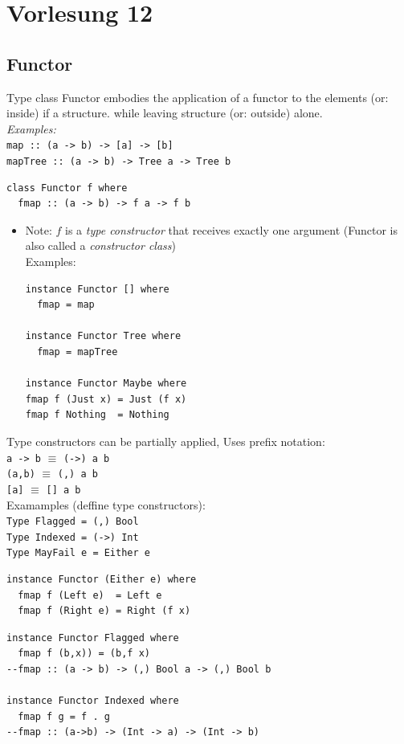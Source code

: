 \documentclass{article}
\newcommand{\Haskell}[1]{\texttt{#1}}
\begin{document}
\section{Vorlesung 12}
\subsection{Functor}
Type class Functor embodies the application of a functor to the elements (or: inside) if a structure. while leaving structure (or: outside) alone.\\
\emph{Examples:}\\
\Haskell{map :: (a -> b) -> [a] -> [b]}\\
\Haskell{mapTree :: (a -> b) -> Tree a -> Tree b}
\begin{verbatim}
class Functor f where
  fmap :: (a -> b) -> f a -> f b
\end{verbatim}
\begin{itemize}
\item Note: $f$ is a \emph{type constructor} that receives exactly one argument (Functor is also called a \emph{constructor class})\\
Examples:\\
\begin{verbatim}
instance Functor [] where
  fmap = map

instance Functor Tree where
  fmap = mapTree

instance Functor Maybe where
fmap f (Just x) = Just (f x)
fmap f Nothing  = Nothing
\end{verbatim}
\end{itemize}
Type constructors can be partially applied, Uses prefix notation:\\
\Haskell{a -> b} $\equiv$ \Haskell{(->) a b}\\
\Haskell{(a,b)}  $\equiv$ \Haskell{(,) a b}\\
\Haskell{[a]}  $\equiv$ \Haskell{[] a b}\\
Examamples (deffine type constructors):\\
\Haskell{Type Flagged   = (,) Bool}\\
\Haskell{Type Indexed   = (->) Int}\\
\Haskell{Type MayFail e = Either e}
\begin{verbatim}
instance Functor (Either e) where
  fmap f (Left e)  = Left e 
  fmap f (Right e) = Right (f x)
\end{verbatim}
\begin{verbatim}
instance Functor Flagged where
  fmap f (b,x)) = (b,f x)
--fmap :: (a -> b) -> (,) Bool a -> (,) Bool b

instance Functor Indexed where
  fmap f g = f . g
--fmap :: (a->b) -> (Int -> a) -> (Int -> b)
\end{verbatim}
\end{document}
